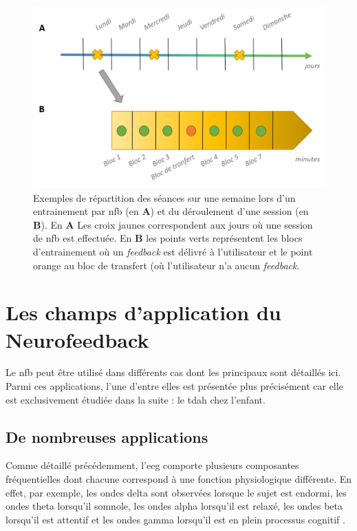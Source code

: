 \begin{figure}[h!]
  \centering
	\includegraphics[width=1\linewidth]{figures/chapter-1/introduction-timeline-session} 
  \caption{Exemples de répartition des séances sur une semaine lors d'un entrainement par \gls{nfb} (en \textbf{A}) et du déroulement d'une session (en \textbf{B}). 
	En \textbf{A} Les croix jaunes correspondent aux jours où une session de \gls{nfb} est effectuée. En \textbf{B} les points verts représentent les blocs d'entrainement où un \textit{feedback}
	est délivré à l'utilisateur et le point orange au bloc de transfert (où l'utilisateur n'a aucun \textit{feedback}.}
  \label{Figure:introduction_timeline_session}
\end{figure}

\section{Les champs d'application du Neurofeedback} \label{applications_NFB}

Le \gls{nfb} peut être utilisé dans différents cas dont les principaux sont détaillés ici. Parmi ces applications, l'une d'entre elles est présentée 
plus précisément car elle est exclusivement étudiée dans la suite : le \gls{tdah} chez l'enfant.

\subsection{De nombreuses applications}

Comme détaillé précédemment, l'\gls{eeg} comporte plusieurs composantes fréquentielles dont chacune correspond à une fonction physiologique différente.
En effet, par exemple, les ondes delta sont observées lorsque le sujet est endormi, les ondes theta lorsqu'il somnole, les ondes alpha lorsqu'il est relaxé, 
les ondes beta lorsqu'il est attentif et les ondes gamma lorsqu'il est en plein processus cognitif \citep{Marzbani2016}. 

